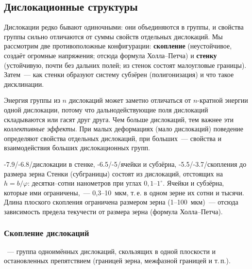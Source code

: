 \subsection{Дислокационные структуры}\label{ssec:disl-structures}

\begin{orientir}
Дислокации редко бывают одиночными: они объединяются в группы, и свойства
группы сильно отличаются от суммы свойств отдельных дислокаций. Мы
рассмотрим две противоположные конфигурации: \textbf{скопление}
(неустойчивое, создаёт огромные напряжения; отсюда формула Холла--Петча)
и \textbf{стенку} (устойчивую, почти без дальних полей; из стенок
состоят малоугловые границы). Затем~— как стенки образуют систему
субзёрен (полигонизация) и что такое дисклинации.
\end{orientir}

\begin{glavnoe}
Энергия группы из $n$ дислокаций может заметно отличаться от $n$-кратной
энергии одной дислокации, потому что дальнодействующие поля дислокаций
складываются или гасят друг друга. Чем больше дислокаций, тем важнее эти
\emph{коллективные эффекты}. При малых деформациях (мало дислокаций)
поведение определяют свойства отдельных дислокаций, при больших~—
свойства и взаимодействия больших дислокационных групп.
\end{glavnoe}

\begin{masshtab}{-7.9/-6.8/{дислокации в стенке}, -6.5/-5/{ячейки и субзёрна}, -5.5/-3.7/{скопления до размера зерна}}
Стенки (субграницы) состоят из дислокаций, отстоящих на $h=b/\varphi$:
десятки--сотни нанометров при углах $0{,}1$--$1^\circ$. Ячейки и субзёрна,
которые ими ограничены,~— 0,3--10~мкм, т.\,е. в одном зерне их сотни и
тысячи. Длина плоского скопления ограничена размером зерна
(1--100~мкм)~— отсюда зависимость предела текучести от размера зерна
(формула Холла--Петча).
\end{masshtab}

\subsubsection{Скопление дислокаций}

\begin{opredelenie}
~— группа одноимённых дислокаций, скользящих
в одной плоскости и остановленных препятствием (границей зерна,
межфазной границей и т.\,п.).
\end{opredelenie}

